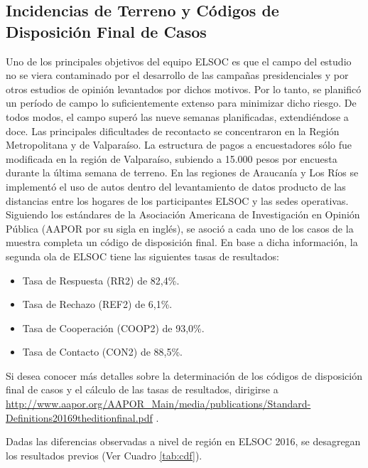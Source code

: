 \documentclass[12pt]{report}
\begin{document}
\subsection*{Incidencias de Terreno y Códigos de Disposición Final de Casos}

Uno de los principales objetivos del equipo ELSOC es que el campo del estudio no se viera contaminado por el desarrollo de las campañas presidenciales y por otros estudios de opinión levantados por dichos motivos. Por lo tanto, se planificó un período de campo lo suficientemente extenso para minimizar dicho riesgo. De todos modos, el campo superó las nueve semanas planificadas, extendiéndose a doce. Las principales dificultades de recontacto se concentraron en la Región Metropolitana y de Valparaíso. La estructura de pagos a encuestadores sólo fue modificada en la región de Valparaíso, subiendo a 15.000 pesos por encuesta durante la última semana de terreno. En las regiones de Araucanía y Los Ríos se implementó el uso de autos dentro del levantamiento de datos producto de las distancias entre los hogares de los participantes ELSOC y las sedes operativas.\\ 

Siguiendo los estándares de la Asociación Americana de Investigación en Opinión Pública (AAPOR por su sigla en inglés), se asoció a cada uno de los casos de la muestra completa un código de disposición final. En base a dicha información, la segunda ola de ELSOC tiene las siguientes tasas de resultados: 
\begin{itemize}
	\item Tasa de Respuesta (RR2) de 82,4\%.
	\item Tasa de Rechazo (REF2) de 6,1\%.
	\item Tasa de Cooperación (COOP2) de 93,0\%.
	\item Tasa de Contacto (CON2) de 88,5\%.
\end{itemize}
Si desea conocer más detalles sobre la determinación de los códigos de disposición final de casos y el cálculo de las tasas de resultados, dirigirse a \url{http://www.aapor.org/AAPOR_Main/media/publications/Standard-Definitions20169theditionfinal.pdf} . 

Dadas las diferencias observadas a nivel de región en ELSOC 2016, se desagregan los resultados previos (Ver Cuadro \ref{tab:cdf}).\\
\end{document}

